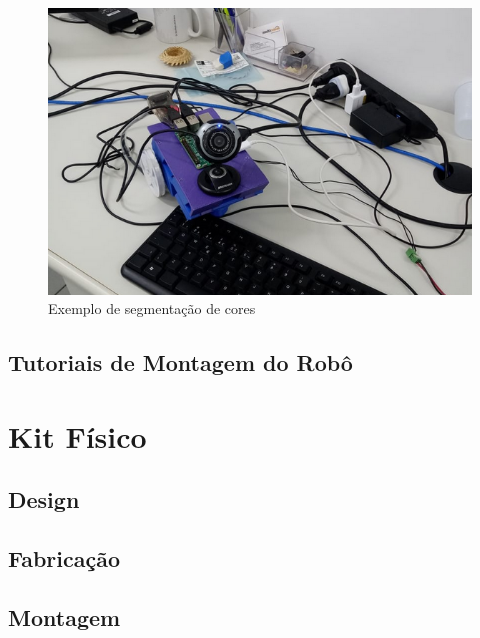  \begin{figure}[H]
 	\centering
 	\includegraphics[scale=0.75, angle=0]{Figures/testefinal.png}
 	\caption{Exemplo de segmentação de cores}
 	\label{fig:testefinal}
 \end{figure}

\subsection{Tutoriais de Montagem do Robô}

\section{Kit Físico}

\subsection{Design}

\subsection{Fabricação}

\subsection{Montagem}
 



